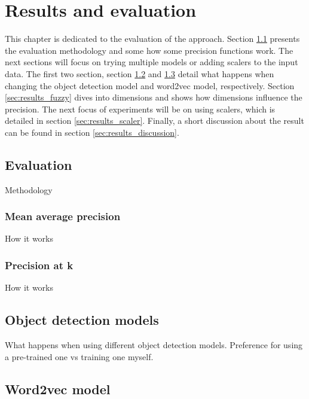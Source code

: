 \chapter{Results and evaluation}
\label{chap:results}

This chapter is dedicated to the evaluation of the approach. Section \ref{sec:results_eval} presents the evaluation methodology and some how some precision functions work. The next sections will focus on trying multiple models or adding scalers to the input data. The first two section, section \ref{sec:results_obj} and \ref{sec:results_word2vec} detail what happens when changing the object detection model and word2vec model, respectively. Section \ref{sec:results_fuzzy} dives into dimensions and shows how dimensions influence the precision. The next focus of experiments will be on using scalers, which is detailed in section \ref{sec:results_scaler}. Finally, a short discussion about the result can be found in section \ref{sec:results_discussion}.

\section{Evaluation}
\label{sec:results_eval}

Methodology


\subsection{Mean average precision}
\label{subsec:results_eval_map}

How it works

\subsection{Precision at k}
\label{subsec:results_eval_patk}

How it works

\section{Object detection models}
\label{sec:results_obj}

What happens when using different object detection models. Preference for using a pre-trained one vs training one myself.

\section{Word2vec model}
\label{sec:results_word2vec}

